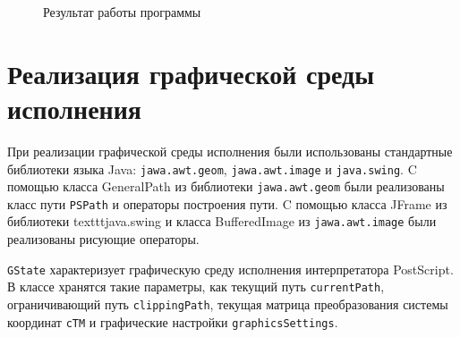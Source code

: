 \begin{figure}[t]
\caption{Результат работы программы}\label{pic_Rect}
\end{figure}

\section{Реализация графической среды исполнения}
\sloppy

При реализации графической среды исполнения были использованы стандартные библиотеки языка Java: \texttt{jawa.awt.geom}, \texttt{jawa.awt.image} и \texttt{java.swing}. C помощью класса GeneralPath из библиотеки \texttt{jawa.awt.geom} были реализованы класс пути \texttt{PSPath} и операторы построения пути. C помощью класса JFrame из библиотеки texttt{java.swing} и класса BufferedImage из \texttt{jawa.awt.image} были реализованы рисующие операторы.

\texttt{GState} характеризует графическую среду исполнения интерпретатора PostScript. В классе хранятся такие параметры, как текущий путь \texttt{currentPath}, ограничивающий путь \texttt{clippingPath}, текущая матрица преобразования системы координат \texttt{cTM} и графические настройки \texttt{graphicsSettings}.

